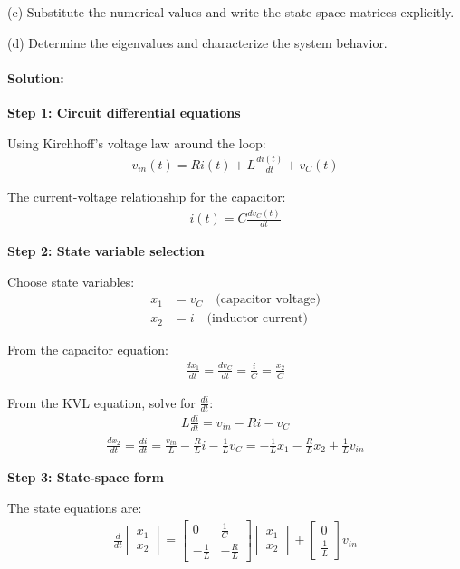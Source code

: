 \documentclass[11pt,a4paper]{article}
\begin{document}
(c) Substitute the numerical values and write the state-space matrices explicitly.

(d) Determine the eigenvalues and characterize the system behavior.

\paragraph{Solution:}

\textbf{Step 1: Circuit differential equations}

Using Kirchhoff's voltage law around the loop:
\begin{align}
  v_{in}(t) = Ri(t) + L\frac{di(t)}{dt} + v_C(t)
\end{align}

The current-voltage relationship for the capacitor:
\begin{align}
  i(t) = C\frac{dv_C(t)}{dt}
\end{align}

\textbf{Step 2: State variable selection}

Choose state variables:
\begin{align}
  x_1 &= v_C \quad \text{(capacitor voltage)} \\
  x_2 &= i \quad \text{(inductor current)}
\end{align}

From the capacitor equation:
\begin{align}
  \frac{dx_1}{dt} = \frac{dv_C}{dt} = \frac{i}{C} = \frac{x_2}{C}
\end{align}

From the KVL equation, solve for $\frac{di}{dt}$:
\begin{align}
  L\frac{di}{dt} = v_{in} - Ri - v_C
\end{align}
\begin{align}
  \frac{dx_2}{dt} = \frac{di}{dt} = \frac{v_{in}}{L} - \frac{R}{L}i - \frac{1}{L}v_C = -\frac{1}{L}x_1 - \frac{R}{L}x_2 + \frac{1}{L}v_{in}
\end{align}

\textbf{Step 3: State-space form}

The state equations are:
\begin{align}
  \frac{d}{dt}\begin{bmatrix} x_1 \\ x_2 \end{bmatrix} = \begin{bmatrix} 0 & \frac{1}{C} \\ -\frac{1}{L} & -\frac{R}{L} \end{bmatrix}\begin{bmatrix} x_1 \\ x_2 \end{bmatrix} + \begin{bmatrix} 0 \\ \frac{1}{L} \end{bmatrix}v_{in}
\end{align}
\end{document}
